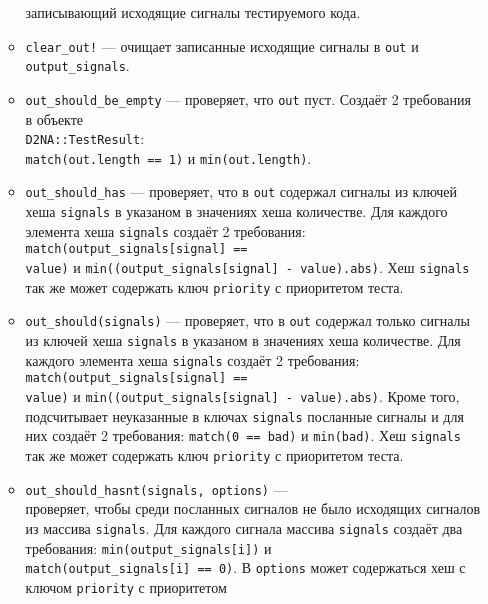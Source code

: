 \documentclass[utf8,a5paper,portrait,10pt,twoside]{eskdtext}
\begin{document}
\begin{itemize}
\begin{itemize}
                записывающий исходящие сигналы тестируемого кода.
          \item \texttt{clear\_out!} — очищает записанные исходящие сигналы в
                \texttt{out} и \texttt{output\_signals}.
          \item \texttt{out\_should\_be\_empty} — проверяет, что \texttt{out}
                пуст. Создаёт 2 требования в объекте\\
                \texttt{D2NA::TestResult}:\\ \texttt{match(out.length == 1)} и
                \texttt{min(out.length)}.
          \item \texttt{out\_should\_has} —  проверяет, что в \texttt{out}
                содержал сигналы из ключей хеша \texttt{signals} в указаном в
                значениях хеша количестве. Для каждого элемента хеша
                \texttt{signals} создаёт 2 требования:
                \texttt{match(output\_signals[signal] ==\\ value)} и
                \texttt{min((output\_signals[signal] - value).abs)}. Хеш
                \texttt{signals} так же может содержать ключ \texttt{priority} с
                приоритетом теста.
          \item \texttt{out\_should(signals)} — проверяет, что в \texttt{out}
                содержал только сигналы из ключей хеша \texttt{signals} в
                указаном в значениях хеша количестве. Для каждого элемента
                хеша \texttt{signals} создаёт 2 требования:
                \texttt{match(output\_signals[signal] ==\\ value)} и
                \texttt{min((output\_signals[signal] - value).abs)}. Кроме того,
                подсчитывает неуказанные в ключах \texttt{signals} посланные
                сигналы и для них создаёт 2 требования: \texttt{match(0 == bad)}
                и \texttt{min(bad)}. Хеш \texttt{signals} так же может содержать
                ключ \texttt{priority} с приоритетом теста.
          \item \texttt{out\_should\_hasnt(signals, options)} —\\ проверяет,
                чтобы среди посланных сигналов не было исходящих сигналов из
                массива \texttt{signals}. Для каждого сигнала массива
                \texttt{signals} создаёт два требования:
                \texttt{min(output\_signals[i])} и\\
                \texttt{match(output\_signals[i] == 0)}. В \texttt{options}
                может содержаться хеш с ключом \texttt{priority} с приоритетом

\end{itemize}
\end{itemize}
\end{document}

